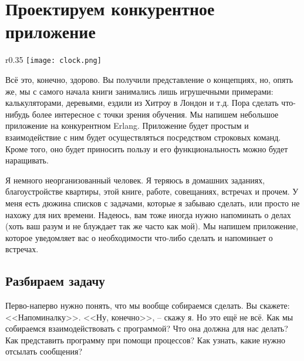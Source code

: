 \chapter{Проектируем конкурентное приложение}
\begin{wrapfigure}{r}{0.35\linewidth}
    \texttt{[image: clock.png]}
\end{wrapfigure}
Всё это, конечно, здорово.
Вы получили представление о концепциях, но, опять же, мы с самого начала книги занимались лишь игрушечными примерами: калькуляторами, деревьями, ездили из Хитроу в Лондон и т.д.
Пора сделать что\--нибудь более интересное с точки зрения обучения.
Мы напишем небольшое приложение на конкурентном Erlang.
Приложение будет простым и взаимодействие с ним будет осуществляться посредством строковых команд.
Кроме того, оно будет приносить пользу и его функциональность можно будет наращивать.

Я немного неорганизованный человек.
Я теряюсь в домашних заданиях, благоустройстве квартиры, этой книге, работе, совещаниях, встречах и прочем.
У меня есть дюжина списков с задачами, которые я забываю сделать, или просто не нахожу для них времени.
Надеюсь, вам тоже иногда нужно напоминать о делах (хоть ваш разум  и не блуждает так же часто как мой).
Мы напишем приложение, которое уведомляет вас о необходимости что\--либо сделать и напоминает о встречах.
\section{Разбираем задачу}
Перво\--наперво нужно понять, что мы вообще собираемся сделать.
Вы скажете: <<Напоминалку>>.
<<Ну, конечно>>, \--- скажу я.
Но это ещё не всё.
Как мы собираемся взаимодействовать с программой?
Что она должна для нас делать?
Как представить программу при помощи процессов?
Как узнать, какие нужно отсылать сообщения?

